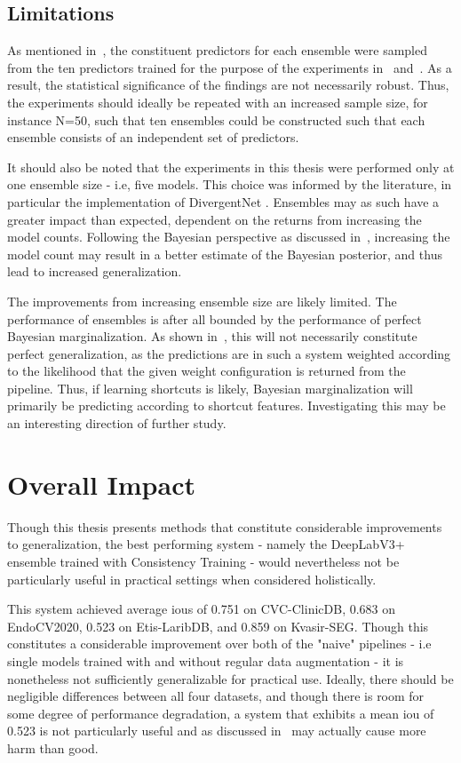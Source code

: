     \subsection{Limitations}
    As mentioned in~, the constituent predictors for each ensemble were sampled from the ten predictors trained for the purpose of the experiments in~ and~. As a result, the statistical significance of the findings are not necessarily robust. Thus, the experiments should ideally be repeated with an increased sample size, for instance N=50, such that ten ensembles could be constructed such that each ensemble consists of an independent set of predictors. 
    
    It should also be noted that the experiments in this thesis were performed only at one ensemble size - i.e, five models. This choice was informed by the literature, in particular the implementation of DivergentNet \cite{divergentnets}. Ensembles may as such have a greater impact than expected, dependent on the returns from increasing the model counts. Following the Bayesian perspective as discussed in~, increasing the model count may result in a better estimate of the Bayesian posterior, and thus lead to increased generalization.
    
    The improvements from increasing ensemble size are likely limited. The performance of ensembles is after all bounded by the performance of perfect Bayesian marginalization. As shown in~, this will not necessarily constitute perfect generalization, as the predictions are in such a system weighted according to the likelihood that the given weight configuration is returned from the pipeline. Thus, if learning shortcuts is likely, Bayesian marginalization will primarily be predicting according to shortcut features. Investigating this may be an interesting direction of further study.
    
\section{Overall Impact}
Though this thesis presents methods that constitute considerable improvements to generalization, the best performing system - namely the DeepLabV3+ ensemble trained with Consistency Training -  would nevertheless not be particularly useful in practical settings when considered holistically.

This system achieved average \glspl{iou} of 0.751 on CVC-ClinicDB, 0.683 on EndoCV2020, 0.523 on Etis-LaribDB, and 0.859 on Kvasir-SEG. Though this constitutes a considerable improvement over both of the "naive" pipelines - i.e single models trained with and without regular data augmentation - it is nonetheless not sufficiently generalizable for practical use. Ideally, there should be negligible differences between all four datasets, and though there is room for some degree of performance degradation, a system that exhibits a mean \gls{iou} of 0.523 is not particularly useful and as discussed in~ may actually cause more harm than good. 

